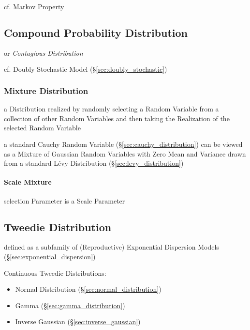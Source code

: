 cf. Markov Property



\subsection{Compound Probability Distribution}
\label{sec:compound_probability}

or \emph{Contagious Distribution}

cf. Doubly Stochastic Model (\S\ref{sec:doubly_stochastic})



\subsubsection{Mixture Distribution}\label{sec:mixture_distribution}

a Distribution realized by randomly selecting a Random Variable from a
collection of other Random Variables and then taking the Realization of the
selected Random Variable

a standard Cauchy Random Variable (\S\ref{sec:cauchy_distribution}) can be
viewed as a Mixture of Gaussian Random Variables with Zero Mean and Variance
drawn from a standard L\'evy Distribution (\S\ref{sec:levy_distribution})



\paragraph{Scale Mixture}\label{sec:scale_mixture}\hfill

selection Parameter is a Scale Parameter



\subsection{Tweedie Distribution}\label{sec:tweedie_distribution}

defined as a subfamily of (Reproductive) Exponential Dispersion Models
(\S\ref{sec:exponential_dispersion})

Continuous Tweedie Distributions:
\begin{itemize}
  \item Normal Distribution (\S\ref{sec:normal_distribution})
  \item Gamma (\S\ref{sec:gamma_distribution})
  \item Inverse Gaussian (\S\ref{sec:inverse_gaussian})
\end{itemize}

